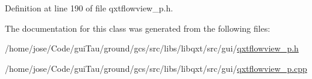 Definition at line 190 of file qxtflowview\-\_\-p.\-h.



The documentation for this class was generated from the following files\-:\begin{DoxyCompactItemize}
\item 
/home/jose/\-Code/gui\-Tau/ground/gcs/src/libs/libqxt/src/gui/\hyperlink{qxtflowview__p_8h}{qxtflowview\-\_\-p.\-h}\item 
/home/jose/\-Code/gui\-Tau/ground/gcs/src/libs/libqxt/src/gui/\hyperlink{qxtflowview__p_8cpp}{qxtflowview\-\_\-p.\-cpp}\end{DoxyCompactItemize}
